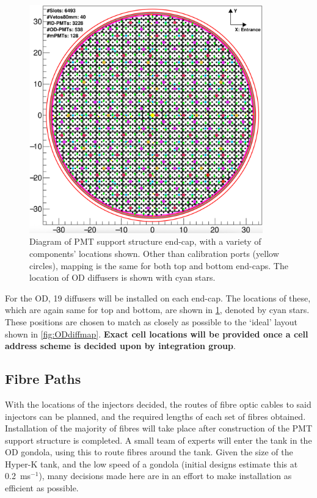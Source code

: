 \documentclass[a4paper,11pt]{article}
\begin{document}
\begin{figure}[h]
\centering
\includegraphics[width=0.9\textwidth]{endcapODdiff.png}
\caption{Diagram of PMT support structure end-cap, with a variety of components' locations shown. Other than calibration ports (yellow circles), mapping is the same for both top and bottom end-caps. The location of OD diffusers is shown with cyan stars.}\label{fig:endcapmap}
\end{figure}

For the OD, 19 diffusers will be installed on each end-cap. The locations of these, which are again same for top and bottom, are shown in \cref{fig:endcapmap}, denoted by cyan stars. These positions are chosen to match as closely as possible to the `ideal' layout shown in \cref{fig:ODdiffmap}. {\bf Exact cell locations will be provided once a cell address scheme is decided upon by integration group}.


\subsection{Fibre Paths}

With the locations of the injectors decided, the routes of fibre optic cables to said injectors can be planned, and the required lengths of each set of fibres obtained. Installation of the majority of fibres will take place after construction of the PMT support structure is completed. A small team of experts will enter the tank in the OD gondola, using this to route fibres around the tank. Given the size of the Hyper-K tank, and the low speed of a gondola (initial designs estimate this at 0.2~ms$^{-1}$), many decisions made here are in an effort to make installation as efficient as possible.
\end{document}
